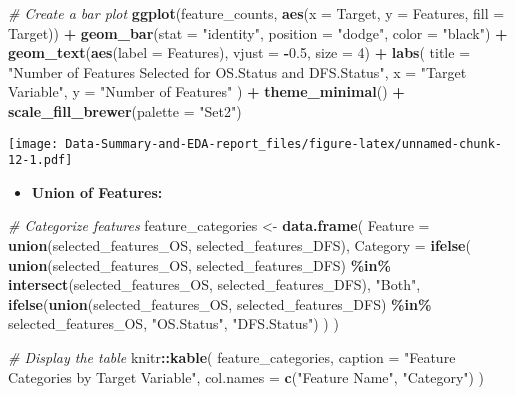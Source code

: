 \documentclass[
]{article}
\newenvironment{Shaded}{\begin{snugshade}}{\end{snugshade}}
\newcommand{\AttributeTok}[1]{\textcolor[rgb]{0.13,0.29,0.53}{#1}}
\newcommand{\CommentTok}[1]{\textcolor[rgb]{0.56,0.35,0.01}{\textit{#1}}}
\newcommand{\DecValTok}[1]{\textcolor[rgb]{0.00,0.00,0.81}{#1}}
\newcommand{\FloatTok}[1]{\textcolor[rgb]{0.00,0.00,0.81}{#1}}
\newcommand{\FunctionTok}[1]{\textcolor[rgb]{0.13,0.29,0.53}{\textbf{#1}}}
\newcommand{\NormalTok}[1]{#1}
\newcommand{\OtherTok}[1]{\textcolor[rgb]{0.56,0.35,0.01}{#1}}
\newcommand{\SpecialCharTok}[1]{\textcolor[rgb]{0.81,0.36,0.00}{\textbf{#1}}}
\newcommand{\StringTok}[1]{\textcolor[rgb]{0.31,0.60,0.02}{#1}}
\providecommand{\tightlist}{%
  \setlength{\itemsep}{0pt}\setlength{\parskip}{0pt}}
\begin{document}
\begin{Shaded}
\begin{Highlighting}[]
\CommentTok{\# Create a bar plot}
\FunctionTok{ggplot}\NormalTok{(feature\_counts, }\FunctionTok{aes}\NormalTok{(}\AttributeTok{x =}\NormalTok{ Target, }\AttributeTok{y =}\NormalTok{ Features, }\AttributeTok{fill =}\NormalTok{ Target)) }\SpecialCharTok{+}
  \FunctionTok{geom\_bar}\NormalTok{(}\AttributeTok{stat =} \StringTok{"identity"}\NormalTok{, }\AttributeTok{position =} \StringTok{"dodge"}\NormalTok{, }\AttributeTok{color =} \StringTok{"black"}\NormalTok{) }\SpecialCharTok{+}
  \FunctionTok{geom\_text}\NormalTok{(}\FunctionTok{aes}\NormalTok{(}\AttributeTok{label =}\NormalTok{ Features), }\AttributeTok{vjust =} \SpecialCharTok{{-}}\FloatTok{0.5}\NormalTok{, }\AttributeTok{size =} \DecValTok{4}\NormalTok{) }\SpecialCharTok{+}
  \FunctionTok{labs}\NormalTok{(}
    \AttributeTok{title =} \StringTok{"Number of Features Selected for OS.Status and DFS.Status"}\NormalTok{,}
    \AttributeTok{x =} \StringTok{"Target Variable"}\NormalTok{,}
    \AttributeTok{y =} \StringTok{"Number of Features"}
\NormalTok{  ) }\SpecialCharTok{+}
  \FunctionTok{theme\_minimal}\NormalTok{() }\SpecialCharTok{+}
  \FunctionTok{scale\_fill\_brewer}\NormalTok{(}\AttributeTok{palette =} \StringTok{"Set2"}\NormalTok{)}
\end{Highlighting}
\end{Shaded}

\texttt{[image: Data-Summary-and-EDA-report\_files/figure-latex/unnamed-chunk-12-1.pdf]}

\begin{itemize}
\tightlist
\item
  \textbf{Union of Features:}
\end{itemize}

\begin{Shaded}
\begin{Highlighting}[]
\CommentTok{\# Categorize features}
\NormalTok{feature\_categories }\OtherTok{\textless{}{-}} \FunctionTok{data.frame}\NormalTok{(}
  \AttributeTok{Feature =} \FunctionTok{union}\NormalTok{(selected\_features\_OS, selected\_features\_DFS),}
  \AttributeTok{Category =} \FunctionTok{ifelse}\NormalTok{(}
    \FunctionTok{union}\NormalTok{(selected\_features\_OS, selected\_features\_DFS) }\SpecialCharTok{\%in\%} \FunctionTok{intersect}\NormalTok{(selected\_features\_OS, selected\_features\_DFS), }\StringTok{"Both"}\NormalTok{,}
    \FunctionTok{ifelse}\NormalTok{(}\FunctionTok{union}\NormalTok{(selected\_features\_OS, selected\_features\_DFS) }\SpecialCharTok{\%in\%}\NormalTok{ selected\_features\_OS, }\StringTok{"OS.Status"}\NormalTok{, }\StringTok{"DFS.Status"}\NormalTok{)}
\NormalTok{  )}
\NormalTok{)}

\CommentTok{\# Display the table}
\NormalTok{knitr}\SpecialCharTok{::}\FunctionTok{kable}\NormalTok{(}
\NormalTok{  feature\_categories,}
  \AttributeTok{caption =} \StringTok{"Feature Categories by Target Variable"}\NormalTok{,}
  \AttributeTok{col.names =} \FunctionTok{c}\NormalTok{(}\StringTok{"Feature Name"}\NormalTok{, }\StringTok{"Category"}\NormalTok{)}
\NormalTok{)}
\end{Highlighting}
\end{Shaded}
\end{document}
